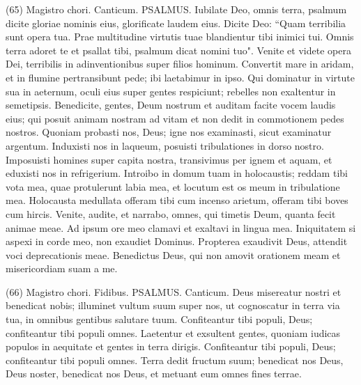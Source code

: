 \begin{biblechapter}  (65) 
\verse  Magistro chori. Canticum. PSALMUS. Iubilate Deo, omnis terra, 
\verse psalmum dicite gloriae nominis eius, glorificate laudem eius. 
\verse Dicite Deo: “Quam terribilia sunt opera tua. Prae multitudine virtutis tuae blandientur tibi inimici tui. 
\verse Omnis terra adoret te et psallat tibi, psalmum dicat nomini tuo". 
\verse Venite et videte opera Dei, terribilis in adinventionibus super filios hominum. 
\verse Convertit mare in aridam, et in flumine pertransibunt pede; ibi laetabimur in ipso. 
\verse Qui dominatur in virtute sua in aeternum, oculi eius super gentes respiciunt; rebelles non exaltentur in semetipsis. 
\verse Benedicite, gentes, Deum nostrum et auditam facite vocem laudis eius; 
\verse qui posuit animam nostram ad vitam et non dedit in commotionem pedes nostros. 
\verse Quoniam probasti nos, Deus; igne nos examinasti, sicut examinatur argentum. 
\verse Induxisti nos in laqueum, posuisti tribulationes in dorso nostro. 
\verse Imposuisti homines super capita nostra, transivimus per ignem et aquam, et eduxisti nos in refrigerium. 
\verse Introibo in domum tuam in holocaustis; reddam tibi vota mea, 
\verse quae protulerunt labia mea, et locutum est os meum in tribulatione mea. 
\verse Holocausta medullata offeram tibi cum incenso arietum, offeram tibi boves cum hircis. 
\verse Venite, audite, et narrabo, omnes, qui timetis Deum, quanta fecit animae meae. 
\verse Ad ipsum ore meo clamavi et exaltavi in lingua mea. 
\verse Iniquitatem si aspexi in corde meo, non exaudiet Dominus. 
\verse Propterea exaudivit Deus, attendit voci deprecationis meae. 
\verse Benedictus Deus, qui non amovit orationem meam et misericordiam suam a me. 
\end{biblechapter}

\begin{biblechapter}  (66) 
\verse  Magistro chori. Fidibus. PSALMUS. Canticum. 
\verse Deus misereatur nostri et benedicat nobis; illuminet vultum suum super nos, 
\verse ut cognoscatur in terra via tua, in omnibus gentibus salutare tuum. 
\verse Confiteantur tibi populi, Deus; confiteantur tibi populi omnes. 
\verse Laetentur et exsultent gentes, quoniam iudicas populos in aequitate et gentes in terra dirigis. 
\verse Confiteantur tibi populi, Deus; confiteantur tibi populi omnes. 
\verse Terra dedit fructum suum; benedicat nos Deus, Deus noster, 
\verse benedicat nos Deus, et metuant eum omnes fines terrae. 
\end{biblechapter}

